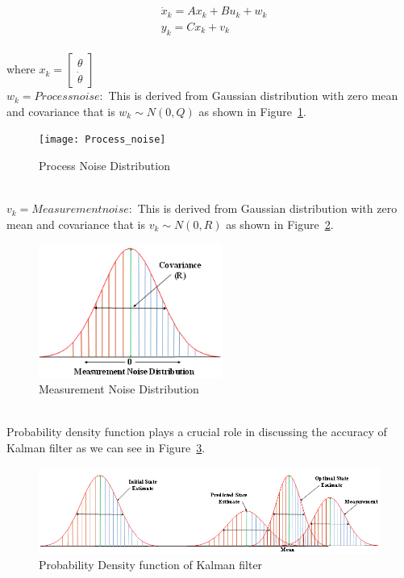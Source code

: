 \documentclass{article}
\begin{document}
\begin{align}
&\dot{x}_{k} = A x_{k} + B u_{k} + w_{k} \label{eq2}\\
&y_{k} = C x_{k} + v_{k} \label{eq1}
\end{align}
\\
where $x_{k} = \begin{bmatrix}

\theta \\ \dot{\theta}
\end{bmatrix} $
\\
$w_{k} = Process noise:$ This is derived from Gaussian distribution with zero mean and covariance that is $w_{k} \sim N(0, Q)$ as shown in Figure~\ref{fig2}.
\\
\begin{figure}[h!]
\begin{center}
\texttt{[image: Process\_noise]}
\caption{Process Noise Distribution}
\label{fig2}
\end{center}
\end{figure}
\\
$v_{k} = Measurement noise:$ This is derived from Gaussian distribution with zero mean and covariance that is $v_{k} \sim N(0, R)$ as shown in Figure~\ref{fig3}.
\\
\begin{figure}[h!]
\begin{center}
\includegraphics[width=6.0cm]{Measure_noise}
\caption{Measurement Noise Distribution}
\label{fig3}
\end{center}
\end{figure}
\\
Probability density function plays a crucial role in discussing the accuracy of Kalman filter as we can see in Figure~\ref{fig4}.
\\
\begin{figure}[h!]
\begin{center}
\includegraphics[width=15.0cm]{Estimate_predict}
\caption{Probability Density function of Kalman filter}
\label{fig4}
\end{center}
\end{figure}
\\
\end{document}
